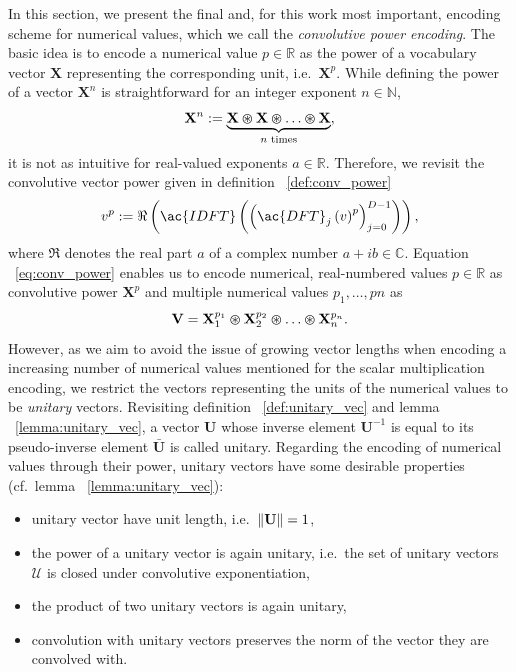 In this section, we present the final and, for this work most important, encoding scheme for numerical values, which we call the \emph{convolutive power encoding}.
The basic idea is to encode a numerical value $p \in \mathbb{R} $ as the power of a vocabulary vector $ \mathbf{X} $ representing the corresponding unit, i.e.\ $ \mathbf{X}^{p} $.
While defining the power of a vector $ \mathbf{X}^{n} $ is straightforward for an integer exponent $ n \in \mathbb{N} $,
\begin{equation}
\label{eq:vector_power_integer}
\mathbf{X}^{n} := \underbrace{ \mathbf{X} \varoast \mathbf{X} \varoast \ldots \varoast \mathbf{X} }_{\textrm{$n$ times}},
\end{equation}
it is not as intuitive for real-valued exponents $a \in \mathbb{R} $.
Therefore, we revisit the convolutive vector power given in definition ~\ref{def:conv_power} 
\begin{equation}
\label{eq:conv_power}
v^{p} := \Re\left(\ac{IDFT} \left(\left(\ac{DFT}_{j}\left(v\right)^{p}\right)_{j=0}^{D-1}\right)\right),
\end{equation}
where $\Re$ denotes the real part $a$ of a complex number $a + ib \in \mathbb{C}$.
Equation ~\ref{eq:conv_power} enables us to encode numerical, real-numbered values $p \in \mathbb{R} $ as convolutive power $ \mathbf{X}^{p}$ and multiple numerical values $ p_{1}, \ldots, p{n}$ as
\begin{equation}
\label{eq:conv_power_several}
\mathbf{V} = \mathbf{X}_{1}^{p_{1}} \varoast \mathbf{X}_{2}^{p_{2}} \varoast \ldots \varoast \mathbf{X}_{n}^{p_{n}}.
\end{equation}
However, as we aim to avoid the issue of growing vector lengths when encoding a increasing number of numerical values mentioned for the scalar multiplication encoding, we restrict the vectors representing the units of the numerical values to be \emph{unitary} vectors.
Revisiting definition ~\ref{def:unitary_vec} and lemma ~\ref{lemma:unitary_vec}, a vector $ \mathbf{U}$ whose inverse element $ \mathbf{U}^{-1} $ is equal to its pseudo-inverse element $ \bar{\mathbf{U}} $ is called unitary.
Regarding the encoding of numerical values through their power, unitary vectors have some desirable properties (cf.\ lemma ~\ref{lemma:unitary_vec}): 
\begin{itemize}
    \item unitary vector have unit length, i.e.\ $\left\|  \mathbf{U}  \right\|=1$,
    \item the power of a unitary vector is again unitary, i.e.\ the set of unitary vectors $ \mathcal{U} $ is closed under convolutive exponentiation,
    \item the product of two unitary vectors is again unitary,
    \item convolution with unitary vectors preserves the norm of the vector they are convolved with.
\end{itemize}

